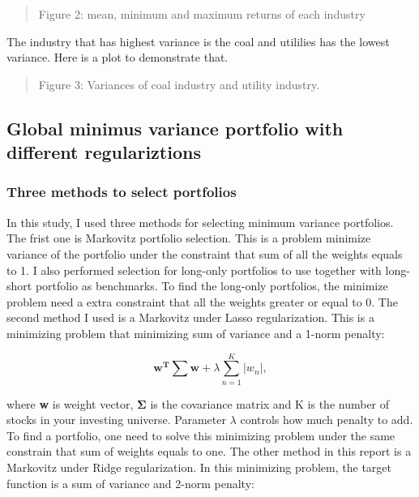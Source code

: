 \documentclass{article}
\newcommand{\ciapdf}[1]{\vspace*{-\parskip}\begin{center}\resizebox{0.75\textwidth}{!}{\texttt{[image: \#1]}}\end{center}}
\begin{document}
\ciapdf{Figure_2T2.pdf}

\begin{quote}
Figure 2: mean, minimum and maximum returns of each industry
\end{quote}

The industry that has highest variance is the coal and utililies has the lowest
variance. Here is a plot to demonstrate that.

\ciapdf{Figure_3T2.pdf}

\begin{quote}
Figure 3: Variances of coal industry and utility industry.
\end{quote}

\subsection*{Global minimus variance portfolio with different regulariztions}

\subsubsection*{Three methods to select portfolios}

In this study, I used three methods for selecting minimum variance portfolios.
The frist one is Markovitz portfolio selection. This is a problem minimize variance
of the portfolio under the constraint that sum of all the weights equals to 1.
I also performed selection for long-only portfolios to use together with long-short
portfolio as benchmarks. To find the long-only portfolios, the minimize problem
need a extra constraint that all the weights greater or equal to 0. The second
method I used is a Markovitz under Lasso regularization. This is a minimizing
problem that minimizing sum of variance and a 1-norm penalty:

\begin{equation*}
\mathbf{w^T\sum w} + \lambda \sum_{n= 1}^{K}\left | w_n \right |,
\end{equation*}

where \textbf{w} is weight vector, $\mathbf{\Sigma}$ is the covariance matrix
and K is the number of stocks in your investing universe. Parameter $\lambda$
controls how much penalty to add. To find a portfolio, one need to
solve this minimizing problem under the same constrain that sum of weights equals
to one. The other method in this report is a Markovitz under Ridge regularization.
In this minimizing problem, the target function is a sum of variance and 2-norm
penalty:
\end{document}
